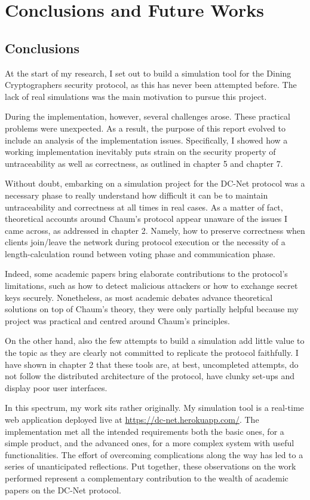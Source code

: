 \chapter{Conclusions and Future Works}

\section{Conclusions}

At the start of my research, I set out to build a simulation tool for the Dining Cryptographers security protocol, as this has never been attempted before. The lack of real simulations was the main motivation to pursue this project. 

During the implementation, however, several challenges arose. These practical problems were unexpected. As a result, the purpose of this report evolved to include an analysis of the implementation issues. Specifically, I showed how a working implementation inevitably puts strain on the security property of untraceability as well as correctness, as outlined in chapter 5 and chapter 7.

Without doubt, embarking on a simulation project for the DC-Net protocol was a necessary phase to really understand how difficult it can be to maintain untraceability and correctness at all times in real cases. As a matter of fact, theoretical accounts around Chaum's protocol appear unaware of the issues I came across, as addressed in chapter 2. Namely, how to preserve correctness when clients join/leave the network during protocol execution or the necessity of a length-calculation round between voting phase and communication phase.
 
Indeed, some academic papers bring elaborate contributions to the protocol's limitations, such as how to detect malicious attackers or how to exchange secret keys securely. Nonetheless, as most academic debates advance theoretical solutions on top of Chaum's theory, they were only partially helpful because my project was practical and centred around Chaum's principles. 

On the other hand, also the few attempts to build a simulation add little value to the topic as they are clearly not committed to replicate the protocol faithfully. I have shown in chapter 2 that these tools are, at best, uncompleted attempts, do not follow the distributed architecture of the protocol, have clunky set-ups and display poor user interfaces. 

In this spectrum, my work sits rather originally. My simulation tool is a real-time web application deployed live at \url{https://dc-net.herokuapp.com/}. The implementation met all the intended requirements both the basic ones, for a simple product, and the advanced ones, for a more complex system with useful functionalities. The effort of overcoming complications along the way has led to a series of unanticipated reflections. Put together, these observations on the work performed represent a complementary contribution to the wealth of academic papers on the DC-Net protocol.

